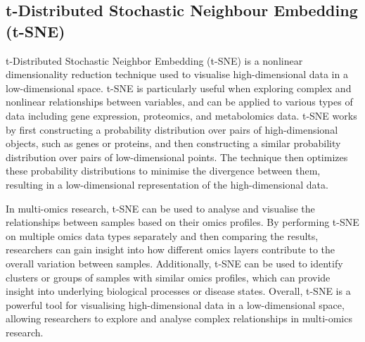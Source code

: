 \documentclass[
]{book}
\newenvironment{Shaded}{\begin{snugshade}}{\end{snugshade}}
\newcommand{\AttributeTok}[1]{\textcolor[rgb]{0.77,0.63,0.00}{#1}}
\newcommand{\CommentTok}[1]{\textcolor[rgb]{0.56,0.35,0.01}{\textit{#1}}}
\newcommand{\ConstantTok}[1]{\textcolor[rgb]{0.00,0.00,0.00}{#1}}
\newcommand{\DecValTok}[1]{\textcolor[rgb]{0.00,0.00,0.81}{#1}}
\newcommand{\FunctionTok}[1]{\textcolor[rgb]{0.00,0.00,0.00}{#1}}
\newcommand{\NormalTok}[1]{#1}
\newcommand{\OtherTok}[1]{\textcolor[rgb]{0.56,0.35,0.01}{#1}}
\newcommand{\SpecialCharTok}[1]{\textcolor[rgb]{0.00,0.00,0.00}{#1}}
\newcommand{\StringTok}[1]{\textcolor[rgb]{0.31,0.60,0.02}{#1}}
\begin{document}
\hypertarget{t-sne}{%
\subsection{t-Distributed Stochastic Neighbour Embedding (t-SNE)}\label{t-sne}}

t-Distributed Stochastic Neighbor Embedding (t-SNE) is a nonlinear dimensionality reduction technique used to visualise high-dimensional data in a low-dimensional space. t-SNE is particularly useful when exploring complex and nonlinear relationships between variables, and can be applied to various types of data including gene expression, proteomics, and metabolomics data. t-SNE works by first constructing a probability distribution over pairs of high-dimensional objects, such as genes or proteins, and then constructing a similar probability distribution over pairs of low-dimensional points. The technique then optimizes these probability distributions to minimise the divergence between them, resulting in a low-dimensional representation of the high-dimensional data.

In multi-omics research, t-SNE can be used to analyse and visualise the relationships between samples based on their omics profiles. By performing t-SNE on multiple omics data types separately and then comparing the results, researchers can gain insight into how different omics layers contribute to the overall variation between samples. Additionally, t-SNE can be used to identify clusters or groups of samples with similar omics profiles, which can provide insight into underlying biological processes or disease states. Overall, t-SNE is a powerful tool for visualising high-dimensional data in a low-dimensional space, allowing researchers to explore and analyse complex relationships in multi-omics research.

\begin{Shaded}
\end{Shaded}
\end{document}
